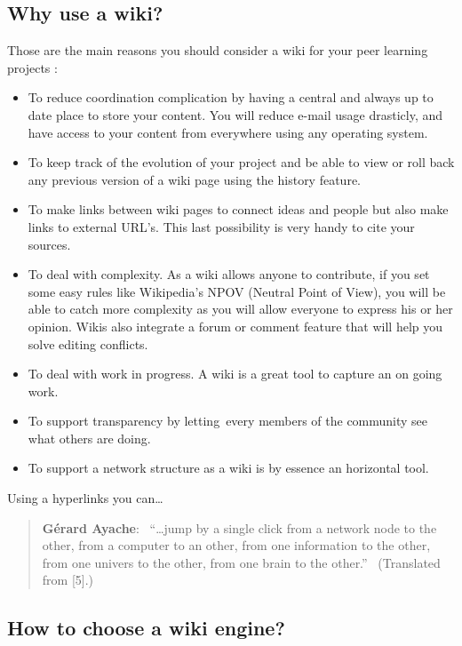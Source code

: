 \subsection{Why use a wiki?}

Those are the main reasons you should consider a wiki for your peer
learning projects :

\begin{itemize}
\itemsep1pt\parskip0pt
\item
  To reduce coordination complication by having a central and always up
  to date place to store your content. You will reduce e-mail usage
  drasticly, and have access to your content from everywhere using any
  operating system.
\item
  To keep track of the evolution of your project and be able to view or
  roll back any previous version of a wiki page using the history
  feature.
\item
  To make links between wiki pages to connect ideas and people but also
  make links to external URL's. This last possibility is very handy to
  cite your sources.
\item
  To deal with complexity. As a wiki allows anyone to contribute, if you
  set some easy rules like Wikipedia's NPOV (Neutral Point of View), you
  will be able to catch more complexity as you will allow everyone to
  express his or her opinion. Wikis also integrate a forum or comment
  feature that will help you solve editing conflicts.
\item
  To deal with work in progress. A wiki is a great tool to capture an on
  going work.
\item
  To support transparency by letting~every members of the community see
  what others are doing.
\item
  To support a network structure as a wiki is by essence an horizontal
  tool.
\end{itemize}

Using a hyperlinks you can\ldots{}

\begin{quote}
\textbf{Gérard Ayache}:~ ``\ldots{}jump by a single click from a network
node to the other, from a computer to an other, from one information to
the other, from one univers to the other, from one brain to the
other.''~ (Translated from {[}5{]}.)
\end{quote}

\subsection{How to choose a wiki engine?}

